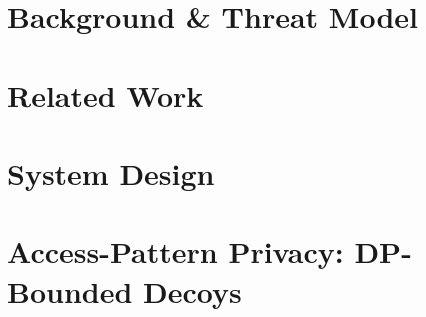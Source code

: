 \documentclass[11pt]{article}
\begin{document}
\section{Background \& Threat Model}
\label{sec:background}

\section{Related Work}
\label{sec:related}

\section{System Design}
\label{sec:design}

\section{Access-Pattern Privacy: DP-Bounded Decoys}
\label{sec:access}
\end{document}

